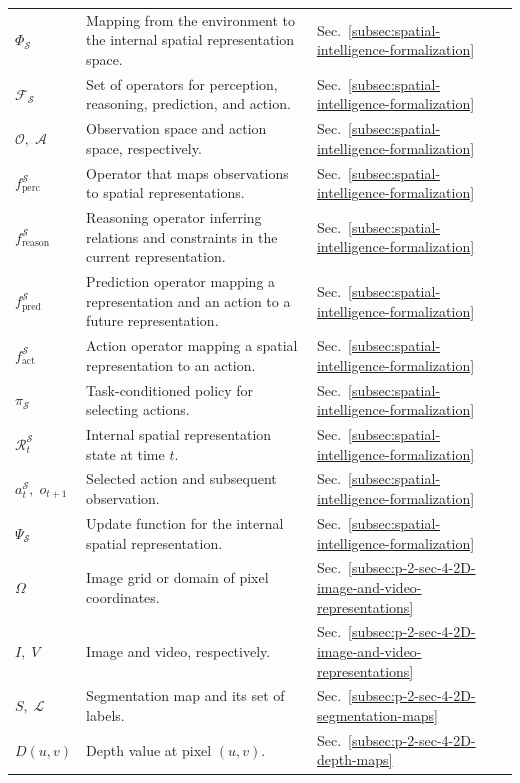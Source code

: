 \begin{longtable}{lll}
$\Phi_{\mathcal{S}}$ & Mapping from the environment to the internal spatial representation space. & Sec.~\ref{subsec:spatial-intelligence-formalization} \\
$\mathcal{F}_{\mathcal{S}}$ & Set of operators for perception, reasoning, prediction, and action. & Sec.~\ref{subsec:spatial-intelligence-formalization} \\
$\mathcal{O},\;\mathcal{A}$ & Observation space and action space, respectively. & Sec.~\ref{subsec:spatial-intelligence-formalization} \\
$f^{\mathcal{S}}_{\mathrm{perc}}$ & Operator that maps observations to spatial representations. & Sec.~\ref{subsec:spatial-intelligence-formalization} \\
$f^{\mathcal{S}}_{\mathrm{reason}}$ & Reasoning operator inferring relations and constraints in the current representation. & Sec.~\ref{subsec:spatial-intelligence-formalization} \\
$f^{\mathcal{S}}_{\mathrm{pred}}$ & Prediction operator mapping a representation and an action to a future representation. & Sec.~\ref{subsec:spatial-intelligence-formalization} \\
$f^{\mathcal{S}}_{\mathrm{act}}$ & Action operator mapping a spatial representation to an action. & Sec.~\ref{subsec:spatial-intelligence-formalization} \\
$\pi_{\mathcal{S}}$ & Task-conditioned policy for selecting actions. & Sec.~\ref{subsec:spatial-intelligence-formalization} \\
$\mathcal{R}^{\mathcal{S}}_t$ & Internal spatial representation state at time $t$. & Sec.~\ref{subsec:spatial-intelligence-formalization} \\
$a^{\mathcal{S}}_t,\;o_{t+1}$ & Selected action and subsequent observation. & Sec.~\ref{subsec:spatial-intelligence-formalization} \\
$\Psi_{\mathcal{S}}$ & Update function for the internal spatial representation. & Sec.~\ref{subsec:spatial-intelligence-formalization} \\
$\Omega$ & Image grid or domain of pixel coordinates. & Sec.~\ref{subsec:p-2-sec-4-2D-image-and-video-representations} \\
$I,\;V$ & Image and video, respectively. & Sec.~\ref{subsec:p-2-sec-4-2D-image-and-video-representations} \\
$S,\;\mathcal{L}$ & Segmentation map and its set of labels. & Sec.~\ref{subsec:p-2-sec-4-2D-segmentation-maps} \\
$D(u,v)$ & Depth value at pixel $(u,v)$. & Sec.~\ref{subsec:p-2-sec-4-2D-depth-maps} \\

\end{longtable}
